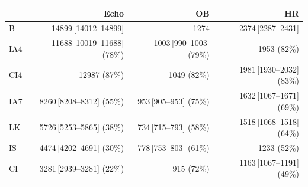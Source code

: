 \begin{tabular}{@{}lrrr@{}}
\toprule
     & Echo & OB & HR \\
\midrule
B & 14899\,\scriptsize[14012--14899] & 1274 & 2374\,\scriptsize[2287--2431] \\
IA4 & 11688\,\scriptsize[10019--11688] (78\%) & 1003\,\scriptsize[990--1003] (79\%) & 1953 (82\%) \\
CI4 & 12987 (87\%) & 1049 (82\%) & 1981\,\scriptsize[1930--2032] (83\%) \\
IA7 & 8260\,\scriptsize[8208--8312] (55\%) & 953\,\scriptsize[905--953] (75\%) & 1632\,\scriptsize[1067--1671] (69\%) \\
LK & 5726\,\scriptsize[5253--5865] (38\%) & 734\,\scriptsize[715--793] (58\%) & 1518\,\scriptsize[1068--1518] (64\%) \\
IS & 4474\,\scriptsize[4202--4691] (30\%) & 778\,\scriptsize[753--803] (61\%) & 1233 (52\%) \\
CI & 3281\,\scriptsize[2939--3281] (22\%) & 915 (72\%) & 1163\,\scriptsize[1067--1191] (49\%) \\
\bottomrule
\end{tabular}
